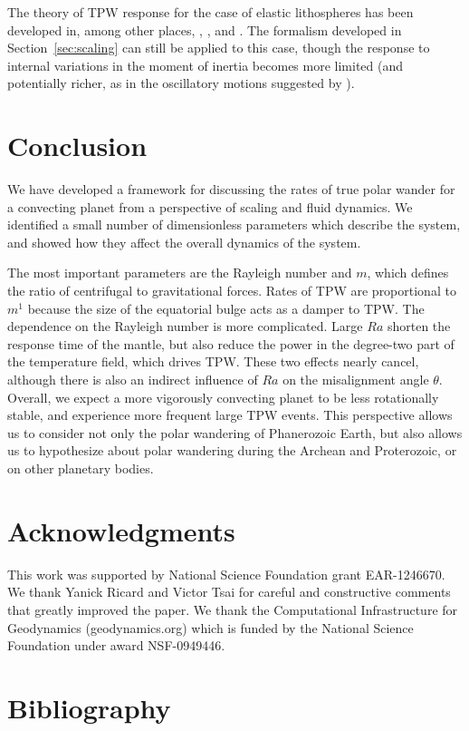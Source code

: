 \documentclass[preprint,12pt,authoryear]{elsarticle}
\begin{document}
The theory of TPW response for the case of elastic lithospheres has been developed in, among other places, 
\citet{matsuyama2006rotational}, \citet{creveling2012mechanisms}, and \citet{chan2014time}.
The formalism developed in Section~\ref{sec:scaling} can still be applied to this case, 
though the response to internal variations in the moment of inertia becomes more limited 
(and potentially richer, as in the oscillatory motions suggested by \citet{creveling2012mechanisms}).

\section{Conclusion}
We have developed a framework for discussing the rates of true polar wander for a convecting planet 
from a perspective of scaling and fluid dynamics.
We identified a small number of dimensionless parameters which describe the system, and showed how they affect the overall dynamics of the system.

The most important parameters are the Rayleigh number and $m$, which defines the ratio of centrifugal to gravitational forces. Rates of TPW are proportional to  $m^{1}$ because the size of the equatorial bulge acts as a damper to TPW.
The dependence on the Rayleigh number is more complicated. Large $Ra$ shorten the response time of the mantle, but also reduce the power in the degree-two part of the temperature field, which drives TPW. These two effects nearly cancel, although there is also an indirect influence of $Ra$ on the misalignment angle $\theta$. Overall, we expect a more vigorously convecting planet to be less rotationally stable, and experience more frequent large TPW events.
This perspective allows us to consider not only the polar wandering of Phanerozoic Earth,
but also allows us to hypothesize about polar wandering during the Archean and Proterozoic, or 
on other planetary bodies.

\section*{Acknowledgments}
This work was supported by National Science Foundation grant EAR-1246670. We thank Yanick Ricard and Victor Tsai for careful and constructive comments that greatly improved the paper.
We thank the Computational Infrastructure for Geodynamics (geodynamics.org) which is funded by the National Science Foundation under award NSF-0949446.

\section*{Bibliography}
 

\end{document}
